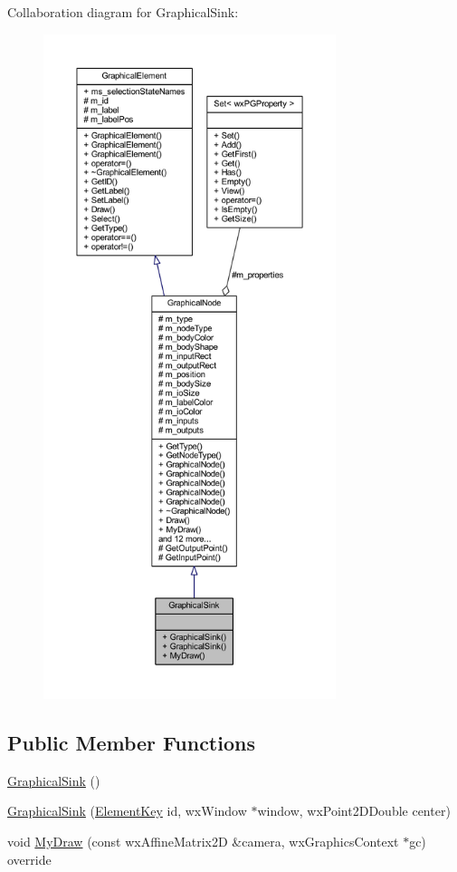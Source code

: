 Collaboration diagram for Graphical\+Sink\+:
\nopagebreak
\begin{figure}[H]
\begin{center}
\leavevmode
\includegraphics[height=550pt]{class_graphical_sink__coll__graph}
\end{center}
\end{figure}
\subsection*{Public Member Functions}
\begin{DoxyCompactItemize}
\item 
\hyperlink{class_graphical_sink_ab59d3cff17a43fac7fc1f364681cd35f}{Graphical\+Sink} ()
\item 
\hyperlink{class_graphical_sink_a2a70f127f23e0e4279b90c565859c7cb}{Graphical\+Sink} (\hyperlink{_graphical_element_8h_ade5fd6c85839a416577ff9de1605141e}{Element\+Key} id, wx\+Window $\ast$window, wx\+Point2\+D\+Double center)
\item 
void \hyperlink{class_graphical_sink_abac58f5bfe23ab2a799560171c036507}{My\+Draw} (const wx\+Affine\+Matrix2D \&camera, wx\+Graphics\+Context $\ast$gc) override
\end{DoxyCompactItemize}
